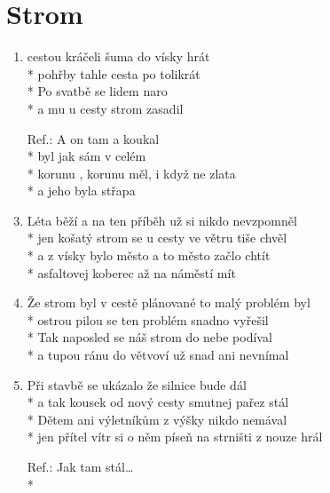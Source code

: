 \section{Strom} %
\begin{enumerate}
\item {} cestou kráčeli šuma do vísky hrát \\*
 pohřby tahle cesta po tolikrát \\*
Po  svatbě se  lidem  naro \\*
a  mu u  cesty  strom zasadil 
\item[Ref.:] A on tam  a koukal  \\*
byl jak  sám v celém  \\*
korunu , korunu měl, i když ne  zlata  \\*
a jeho  byla  střapa 
\item Léta běží a na ten příběh už si nikdo nevzpomněl \\*
jen košatý strom se u cesty ve větru tiše chvěl \\*
a z vísky bylo město a to město začlo chtít \\*
asfaltovej koberec až na náměstí mít 
\item Že strom byl v cestě plánované to malý problém byl \\*
ostrou pilou se ten problém snadno vyřešil \\*
Tak naposled se náš strom do nebe podíval \\*
a tupou ránu do větvoví už snad ani nevnímal 
\item Při stavbě se ukázalo že silnice bude dál \\*
a tak kousek od nový cesty smutnej pařez stál \\*
Dětem ani výletníkům z výšky nikdo nemával \\*
jen přítel vítr si o něm píseň na strništi z nouze hrál 
\item[Ref.:] Jak tam stál… \\*
\end{enumerate}
